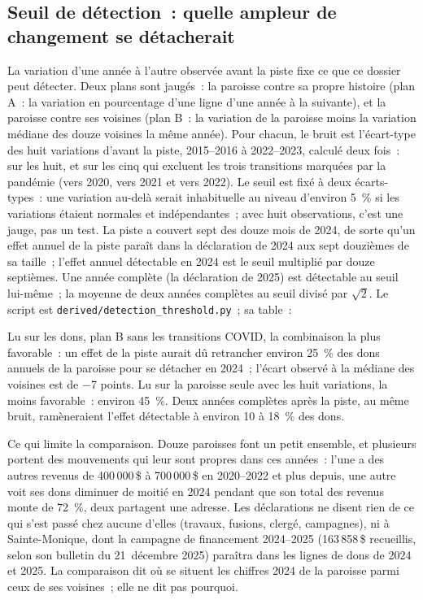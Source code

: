 \documentclass[11pt,letterpaper]{article}
\newcommand{\D}[1]{#1\,\$}
\begin{document}
\subsection{Seuil de détection~: quelle ampleur de changement se détacherait}\label{sec:threshold}

La variation d'une année à l'autre observée avant la piste fixe ce que ce dossier peut détecter. Deux plans sont jaugés~: la paroisse contre sa propre histoire (plan A~: la variation en pourcentage d'une ligne d'une année à la suivante), et la paroisse contre ses voisines (plan B~: la variation de la paroisse moins la variation médiane des douze voisines la même année). Pour chacun, le bruit est l'écart-type des huit variations d'avant la piste, 2015--2016 à 2022--2023, calculé deux fois~: sur les huit, et sur les cinq qui excluent les trois transitions marquées par la pandémie (vers 2020, vers 2021 et vers 2022). Le seuil est fixé à deux écarts-types~: une variation au-delà serait inhabituelle au niveau d'environ 5~\% si les variations étaient normales et indépendantes~; avec huit observations, c'est une jauge, pas un test. La piste a couvert sept des douze mois de 2024, de sorte qu'un effet annuel de la piste paraît dans la déclaration de 2024 aux sept douzièmes de sa taille~; l'effet annuel détectable en 2024 est le seuil multiplié par douze septièmes. Une année complète (la déclaration de 2025) est détectable au seuil lui-même~; la moyenne de deux années complètes au seuil divisé par $\sqrt{2}$. Le script est \texttt{derived/detection\_threshold.py}~; sa table~:

\begin{center}\resizebox{\textwidth}{!}{}\end{center}

Lu sur les dons, plan B sans les transitions COVID, la combinaison la plus favorable~: un effet de la piste aurait dû retrancher environ 25~\% des dons annuels de la paroisse pour se détacher en 2024~; l'écart observé à la médiane des voisines est de $-$7 points. Lu sur la paroisse seule avec les huit variations, la moins favorable~: environ 45~\%. Deux années complètes après la piste, au même bruit, ramèneraient l'effet détectable à environ 10 à 18~\% des dons.

Ce qui limite la comparaison. Douze paroisses font un petit ensemble, et plusieurs portent des mouvements qui leur sont propres dans ces années~: l'une a des autres revenus de \D{400\,000} à \D{700\,000} en 2020--2022 et plus depuis, une autre voit ses dons diminuer de moitié en 2024 pendant que son total des revenus monte de 72~\%, deux partagent une adresse. Les déclarations ne disent rien de ce qui s'est passé chez aucune d'elles (travaux, fusions, clergé, campagnes), ni à Sainte-Monique, dont la campagne de financement 2024--2025 (\D{163\,858} recueillis, selon son bulletin du 21~décembre 2025) paraîtra dans les lignes de dons de 2024 et 2025. La comparaison dit où se situent les chiffres 2024 de la paroisse parmi ceux de ses voisines~; elle ne dit pas pourquoi.
\end{document}
